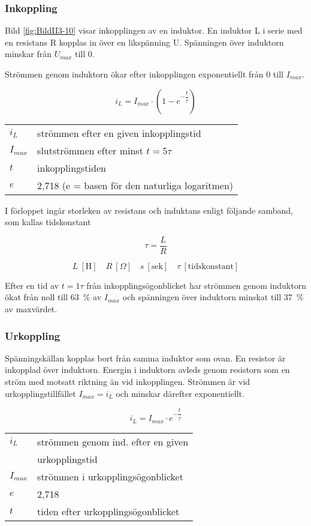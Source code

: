 \subsubsection{Inkoppling}


Bild \ref{fig:BildII3-10} visar inkopplingen av en induktor.
En induktor L i serie med en resistans R kopplas in över en likspänning U.
Spänningen över induktorn minskar från \(U_{max}\) till 0.

Strömmen genom induktorn ökar efter inkopplingen exponentiellt från 0 till \(I_{max}\).

\[i_L = I_{max} \cdot (1-e^{-\dfrac{t}{\tau}} )\]

\begin{tabular}{lp{}}
  \(i_L\) &  strömmen efter en given inkopplingstid \\
  \(I_{max}\) & slutströmmen efter minst \(t = 5\tau\) \\
  \(t\) & inkopplingstiden \\
  \(e\) & 2,718 (e = basen för den naturliga logaritmen) \\
\end{tabular}

I förloppet ingår storleken av resistans och induktans enligt följande samband,
som kallas tidskonstant

\[\tau = \frac{L}{R}\]

\[
L\ [\text{H}] \quad
R\ [\Omega] \quad
s\ [\text{sek}] \quad
\tau\ [\text{tidskonstant}]
\]

Efter en tid av \(t = 1\tau\) från inkopplingsögonblicket har strömmen genom
induktorn ökat från noll till 63~\% av \(I_{max}\) och spänningen över induktorn
minskat till 37~\% av maxvärdet.

\subsubsection{Urkoppling}

Spänningskällan kopplas bort från samma induktor som ovan.
En resistor är inkopplad över induktorn.
Energin i induktorn avleds genom resistorn som en ström med motsatt riktning än vid inkopplingen.
Strömmen är vid urkopplingstillfället \(I_{max} = i_L\) och minskar därefter exponentiellt.

\[i_L = I_{max} \cdot e^{-\dfrac{t}{\tau}}\]

\begin{tabular}{lp{}}
  \(i_L\) & strömmen genom ind. efter en given \\
          &ur\-kop\-p\-li\-ngs\-tid \\
  \(I_{max}\) & strömmen i urkopplingsögonblicket \\
  \(e\) & 2,718 \\
  \(t\) & tiden efter urkopplingsögonblicket \\
\end{tabular}


